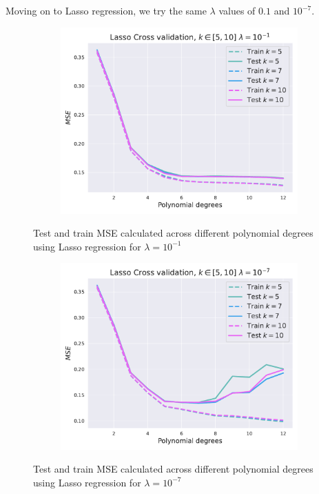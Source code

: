 \documentclass[twocolumn,english,notitlepage]{article}
\begin{document}
        Moving on to Lasso regression, we try the same $\lambda$ values of $0.1$ and $10^{-7}$. 

        \begin{figure}[ht]
            \begin{subfigure}{\linewidth}
                \centering
                \includegraphics[width=\linewidth]{bad_lmbda_Lasso_mse_kfold.pdf}
            \end{subfigure}
            \caption{Test and train MSE calculated across different polynomial degrees using Lasso regression for $\lambda = 10^{-1}$}
            \label{res:fig:lasso_cv_badlambda}
            \begin{subfigure}{\linewidth}
                \centering
                \includegraphics[width=\linewidth]{good_lmbda_Lasso_mse_kfold.pdf}
            \end{subfigure}
            \caption{Test and train MSE calculated across different polynomial degrees using Lasso regression for $\lambda = 10^{-7}$}
            \label{res:fig:lasso_cv_goodlambda}
        \end{figure}
\end{document}
